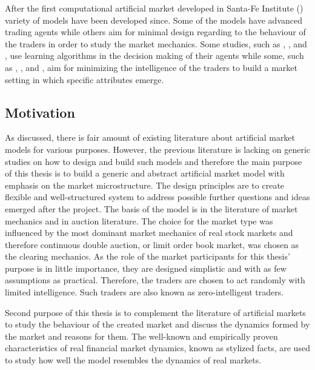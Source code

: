 After the first computational artificial market developed in Santa-Fe Institute
(\citet{SantaFe94}) variety of models have been developed since. Some of the
models have advanced trading agents while others aim for minimal design 
regarding to the behaviour of the traders in order to study the market
mechanics. Some studies, such as \citet{GOYKHMAN20181729}, \citet{IZUMI200535},
\citet{Reinforcement09} and \citet{YEH20102089}, use learning algorithms in the decision making of 
their agents while some, such as \citet{God93}, \citet{Jam96}, \citet{Genoa01} and \citet{Raberto05}, 
aim for minimizing the intelligence of the traders to build a market setting in which
specific attributes emerge. %


\subsection{Motivation}

As discussed, there is fair amount of existing literature about artificial market models for various
purposes. However, the previous literature is lacking on generic studies on how to design
and build such models and therefore the main purpose of this thesis is to build a generic and abstract 
artificial market model with emphasis on the market microstructure. The design principles are to create flexible 
and well-structured system to address possible further questions and ideas emerged after the project. 
The basis of the model is in the literature of market mechanics and in auction literature. The choice for the
market type was influenced by the most dominant market mechanics of real stock markets and therefore
continuous double auction, or limit order book market, was chosen as the clearing mechanics. As the 
role of the market participants for this thesis' purpose is in little importance, they are designed
simplistic and with as few assumptions as practical. Therefore, the traders are chosen to act randomly
with limited intelligence. Such traders are also known as zero-intelligent traders. 

Second purpose of this thesis is to complement the literature of artificial markets to study 
the behaviour of the created market and discuss the dynamics formed by the market and reasons for them.
The well-known and empirically proven characteristics of real financial market dynamics, known as 
stylized facts, are used to study how well the model resembles the dynamics of real markets.

